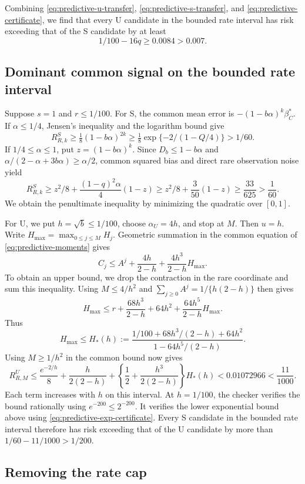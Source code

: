 Combining \eqref{eq:predictive-u-transfer},
\eqref{eq:predictive-s-transfer}, and \eqref{eq:predictive-certificate},
we find that every U candidate in the bounded rate interval has risk exceeding
that of the S candidate by at least
\[
 1/100-16q\geq0.0084>0.007.
\]

\subsection{Dominant common signal on the bounded rate interval}

Suppose $s=1$ and $r\leq1/100$. For S, the common mean error is
$-(1-b\alpha)^k\beta_C^*$. If $\alpha\leq1/4$, Jensen's inequality and the
logarithm bound give
\[
 R_{R,k}^S\geq\tfrac18(1-b\alpha)^{2k}
 \geq\tfrac18\exp\{-2/(1-Q/4)\}>1/60.
\]
If $1/4\leq\alpha\leq1$, put $z=(1-b\alpha)^k$. Since
$D_b\leq1-b\alpha$ and $\alpha/(2-\alpha+3b\alpha)\geq\alpha/2$, common
squared bias and direct rare observation noise yield
\[
 R_{R,k}^S\geq z^2/8+\frac{(1-q)^2\alpha}{4}(1-z)
 \geq z^2/8+\frac3{50}(1-z)\geq\frac{33}{625}>\frac1{60}.
\]
We obtain the penultimate inequality by minimizing the quadratic over $[0,1]$.

For U, we put $h=\sqrt b\leq1/100$, choose $\alpha_U=4h$, and stop at $M$.
Then $u=h$. Write $H_{\max}=\max_{0\leq j\leq M}H_j$. Geometric summation
in the common equation of \eqref{eq:predictive-moments} gives
\[
 C_j\leq A^j+\frac{4h}{2-h}+\frac{4h^3}{2-h}H_{\max}.
\]
To obtain an upper bound, we drop the contraction in the rare coordinate and
sum this inequality. Using $M\leq4/h^2$ and
$\sum_{j\geq0}A^j=1/\{h(2-h)\}$ then gives
\[
 H_{\max}\leq r+\frac{68h^3}{2-h}+64h^2+
                       \frac{64h^5}{2-h}H_{\max}.
\]
Thus
\[
 H_{\max}\leq H_*(h):=
 \frac{1/100+68h^3/(2-h)+64h^2}{1-64h^5/(2-h)}.
\]
Using $M\geq1/h^2$ in the common bound now gives
\[
 R_{R,M}^U\leq\frac{e^{-2/h}}8+
     \frac{h}{2(2-h)}+
     \left\{\frac12+\frac{h^3}{2(2-h)}\right\}H_*(h)
 <0.01072966<\frac{11}{1000}.
\]
Each term increases with $h$ on this interval. At $h=1/100$, the checker
verifies the bound rationally using $e^{-200}\leq2^{-200}$. It verifies the
lower exponential bound above using \eqref{eq:predictive-exp-certificate}.
Every S candidate in the bounded rate interval therefore has risk exceeding
that of the U candidate by more than
$1/60-11/1000>1/200$.

\subsection{Removing the rate cap}


